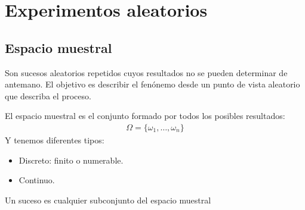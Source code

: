 \documentclass{../Probabilidad.tex}
\begin{document}
\section{Experimentos aleatorios}
\subsection{Espacio muestral}
Son sucesos aleatorios repetidos cuyos resultados no se pueden determinar de
antemano. El objetivo es describir el fenónemo desde un punto de vista aleatorio
que describa el proceso.
\begin{defin}
	El espacio muestral es el conjunto formado por todos los posibles resultados:
	\begin{equation}
		\begin{split}
		\Omega = \{ \omega_{1},\dots ,\omega_{n} \}
		\end{split}
	\end{equation}
	Y tenemos diferentes tipos:
	\begin{itemize}
		\item Discreto: finito o numerable.
		\item Continuo.
	\end{itemize}
\end{defin}
\begin{defin}
	Un suceso es cualquier subconjunto del espacio muestral
\end{defin}
\end{document}
